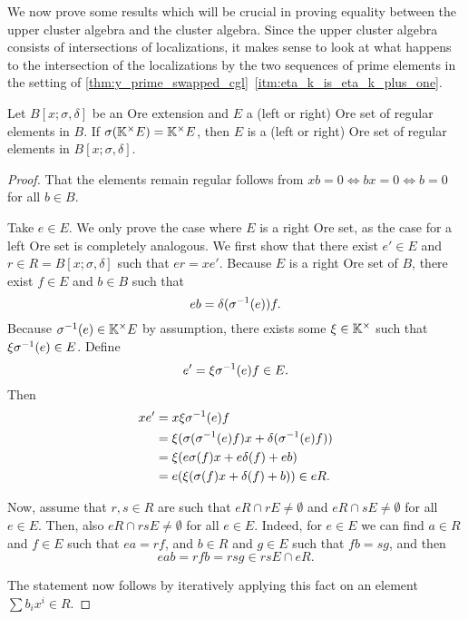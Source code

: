 We now prove some results which will be crucial in proving equality between the upper
cluster algebra and the cluster algebra. Since the upper cluster algebra consists of
intersections of localizations, it makes sense to look at what happens to the
intersection of the localizations by the two sequences of prime elements in the setting
of \cref{thm:y_prime_swapped_cgl}~\ref*{itm:eta_k_is_eta_k_plus_one}.

\begin{lemma}\label{lem:ore_set_ore_extension}
	Let $B[x;\sigma,\delta]$ be an Ore extension and $E$ a (left or right) Ore set of
	regular elements in $B$. If $\sigma(\mathbb{K}^\times E) = \mathbb{K}^\times E$, then $E$ is a
	(left or right) Ore set of regular elements in $B[x;\sigma, \delta]$.
\end{lemma}
\begin{proof}
	That the elements remain regular follows from $x b = 0 \iff b x = 0 \iff b = 0$ for all
	$b \in B$.

	Take $e \in E$. We only prove the case where $E$ is a right Ore set, as the case for a
	left Ore set is completely analogous. We first show that there exist $e' \in E$ and $r
		\in R = B[x; \sigma, \delta]$ such that $er = x e'$. Because $E$ is a right Ore set of
	$B$, there exist $f\in E$ and $b \in B$ such that
	\begin{equation*}
		e b = \delta(\sigma^{-1}(e))f.
	\end{equation*}
	Because $\sigma^{-1}(e) \in \mathbb{K}^\times E$ by assumption, there exists some $\xi \in \mathbb{K}^\times$ such that $\xi \sigma^{-1}(e) \in E$.
	Define
	\begin{equation*}
		e' = \xi \sigma^{-1}(e)f \in E.
	\end{equation*}
	Then
	\begin{align*}
		xe' & = x\xi\sigma^{-1}(e)f                                     \\
		    & = \xi (\sigma(\sigma^{-1}(e)f)x + \delta(\sigma^{-1}(e)f)) \\
		    & = \xi(e\sigma(f)x + e \delta(f) + e b)                   \\
		    & = e(\xi (\sigma(f)x + \delta(f) + b)) \in eR.
	\end{align*}

	Now, assume that $r,s \in R$ are such that $e R \cap r E \neq \emptyset$ and $e R \cap
		s E \neq \emptyset$ for all $e \in E$. Then, also $e R \cap rs E \neq \emptyset$ for
	all $e\in E$. Indeed, for $e \in E$ we can find $a \in R$ and $f \in E$ such that $ea =
		r f$, and $b \in R$ and $g \in E$ such that $f b = s g$, and then
	\begin{equation*}
		e a b = r f b = r s g \in rs E \cap e R.
	\end{equation*}

	The statement now follows by iteratively applying this fact on an element $\sum b_i x^i
		\in R$.
\end{proof}


